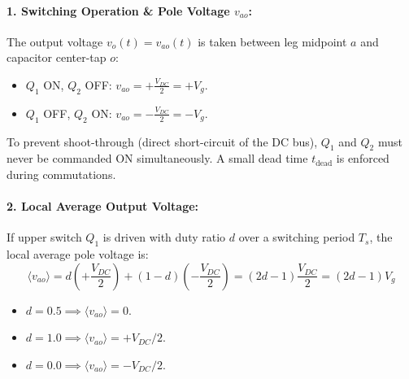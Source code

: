 \paragraph{1. Switching Operation \& Pole Voltage $v_{ao}$:}
The output voltage $v_o(t) = v_{ao}(t)$ is taken between leg midpoint $a$ and capacitor center-tap $o$:
\begin{itemize}
  \item $Q_1$ ON, $Q_2$ OFF: $v_{ao} = +\frac{V_{DC}}{2} = +V_g$.
  \item $Q_1$ OFF, $Q_2$ ON: $v_{ao} = -\frac{V_{DC}}{2} = -V_g$.
\end{itemize}
To prevent shoot-through (direct short-circuit of the DC bus), $Q_1$ and $Q_2$ must never be commanded ON simultaneously. A small dead time $t_{\mathrm{dead}}$ is enforced during commutations.

\paragraph{2. Local Average Output Voltage:}
If upper switch $Q_1$ is driven with duty ratio $d$ over a switching period $T_s$, the local average pole voltage is:
\begin{equation}
\langle v_{ao} \rangle = d \left(+\frac{V_{DC}}{2}\right) + (1-d) \left(-\frac{V_{DC}}{2}\right) = (2d - 1)\frac{V_{DC}}{2} = (2d - 1)V_g
\end{equation}
\begin{itemize}
  \item $d = 0.5 \implies \langle v_{ao} \rangle = 0$.
  \item $d = 1.0 \implies \langle v_{ao} \rangle = +V_{DC}/2$.
  \item $d = 0.0 \implies \langle v_{ao} \rangle = -V_{DC}/2$.
\end{itemize}


